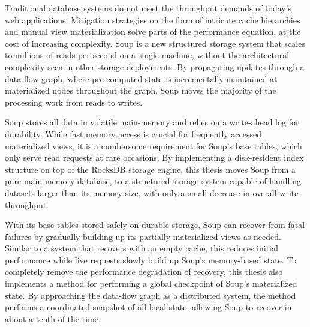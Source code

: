 Traditional database systems do not meet the throughput demands of today's web
applications. Mitigation strategies on the form of intricate cache hierarchies
and manual view materialization solve parts of the performance equation, at the
cost of increasing complexity. Soup is a new structured storage system that
scales to millions of reads per second on a single machine, without the
architectural complexity seen in other storage deployments. By propagating
updates through a data-flow graph, where pre-computed state is incrementally
maintained at materialized nodes throughout the graph, Soup moves the majority
of the processing work from reads to writes.

Soup stores all data in volatile main-memory and relies on a write-ahead log for
durability. While fast memory access is crucial for frequently accessed
materialized views, it is a cumbersome requirement for Soup's base tables, which
only serve read requests at rare occasions. By implementing a disk-resident
index structure on top of the RocksDB storage engine, this thesis moves Soup
from a pure main-memory database, to a structured storage system capable of
handling datasets larger than its memory size, with only a small decrease in
overall write throughput.

With its base tables stored safely on durable storage, Soup can recover from
fatal failures by gradually building up its partially materialized views as
needed. Similar to a system that recovers with an empty cache, this reduces
initial performance while live requests slowly build up Soup's memory-based
state. To completely remove the performance degradation of recovery, this thesis
also implements a method for performing a global checkpoint of Soup's
materialized state. By approaching the data-flow graph as a distributed system,
the method performs a coordinated snapshot of all local state, allowing Soup to
recover in about a tenth of the time.

